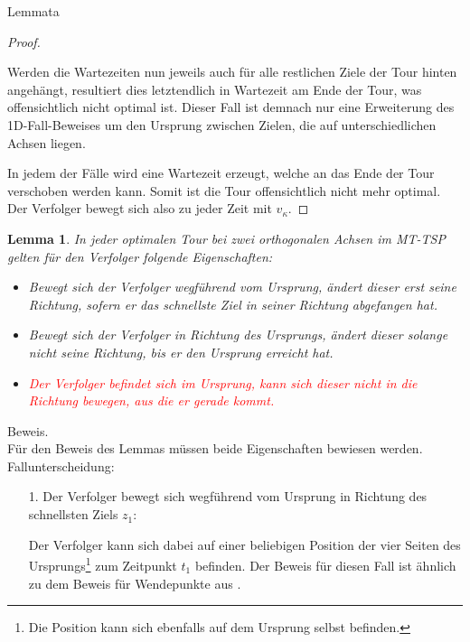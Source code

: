 \documentclass[10pt,table,xcolor=dvipsnames]{beamer}
\newtheorem{lem}{Lemma}
\begin{document}
\begin{frame}{Lemmata}
\begin{proof}
\begin{enumerate}
Werden die Wartezeiten nun jeweils auch für alle restlichen Ziele der Tour hinten angehängt, resultiert dies letztendlich in Wartezeit am Ende der Tour, was offensichtlich nicht optimal ist. Dieser Fall ist demnach nur eine Erweiterung des 1D-Fall-Beweises um den Ursprung zwischen Zielen, die auf unterschiedlichen Achsen liegen. 
\end{enumerate}
In jedem der Fälle wird eine Wartezeit erzeugt, welche an das Ende der Tour verschoben werden kann. Somit ist die Tour offensichtlich nicht mehr optimal. Der Verfolger bewegt sich also zu jeder Zeit mit $v_{\kappa}$.
\end{proof}

\framebreak

\begin{lem}
\label{lem:2}
In jeder optimalen Tour bei zwei orthogonalen Achsen im MT-TSP gelten für den Verfolger folgende Eigenschaften:
\begin{itemize}
\item
Bewegt sich der Verfolger wegführend vom Ursprung, ändert dieser erst seine Richtung, sofern er das schnellste Ziel in seiner Richtung abgefangen hat.
\item
Bewegt sich der Verfolger in Richtung des Ursprungs, ändert dieser solange nicht seine Richtung, bis er den Ursprung erreicht hat.
\item
\textcolor{red}{Der Verfolger befindet sich im Ursprung, kann sich dieser nicht in die Richtung bewegen, aus die er gerade kommt.}
\end{itemize}
\end{lem}

\framebreak

\textcolor{TealBlue}{Beweis.}\\
Für den Beweis des Lemmas müssen beide Eigenschaften bewiesen werden. Fallunterscheidung:
\begin{itemize}
\item[1.]
Der Verfolger bewegt sich wegführend vom Ursprung in Richtung des schnellsten Ziels $z_1$: 

Der Verfolger kann sich dabei auf einer beliebigen Position der vier Seiten des Ursprungs\footnote{Die Position kann sich ebenfalls auf dem Ursprung selbst befinden.} zum Zeitpunkt $t_1$ befinden. Der Beweis für diesen Fall ist ähnlich zu dem Beweis für Wendepunkte aus \cite{helvig}.


\end{itemize}
\end{frame}
\end{document}
